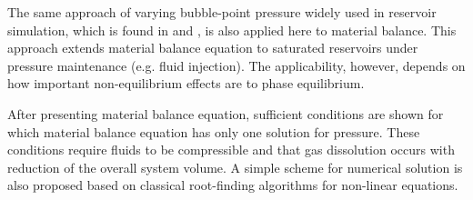 \documentclass[authoryear,preprint,review,11pt]{elsarticle}
\begin{document}




The same approach of varying bubble-point pressure widely used in reservoir simulation, which is found in \cite{aziz1979petroleum} and \cite{ertekin2001basic}, is also applied here to material balance. This approach extends material balance equation to saturated reservoirs under pressure maintenance (e.g. fluid injection). The applicability, however, depends on how important non-equilibrium effects are to phase equilibrium.


After presenting material balance equation, sufficient conditions are shown for which material balance equation has only one solution for pressure. These conditions require fluids to be compressible and that gas dissolution occurs with reduction of the overall system volume. A simple scheme for numerical solution is also proposed based on classical root-finding algorithms for non-linear equations.
\end{document}
